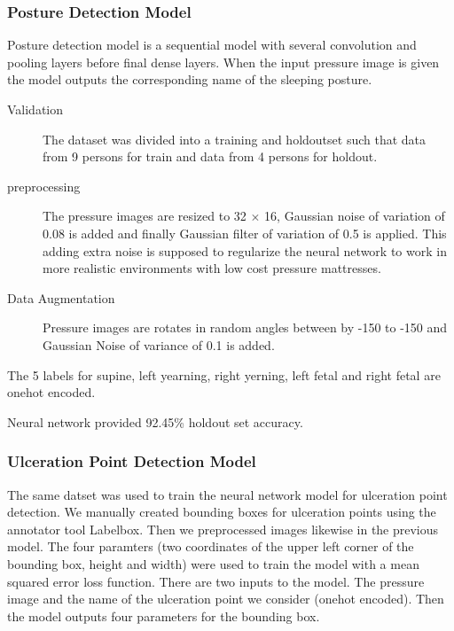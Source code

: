 \subsubsection{Posture Detection Model}

Posture detection model is a sequential model with several convolution and pooling layers before final dense layers. When the input pressure image is given the model outputs the corresponding name of the sleeping posture.


\begin{description}
	\item[Validation] The dataset was divided into a training and holdoutset such that data from 9 persons for train and data from 4 persons for holdout.
	\item[preprocessing] The pressure images are resized to 32 $\times$ 16, Gaussian noise of variation of 0.08 is added and finally Gaussian filter of variation of 0.5 is applied. This adding extra noise is supposed to regularize the neural network to work in more realistic environments with low cost pressure mattresses.
	\item[Data Augmentation]  Pressure images are rotates in random angles between by -150 to -150 and Gaussian Noise of variance of 0.1 is added.	
\end{description}

The 5 labels for supine, left yearning, right yerning, left fetal and right fetal are onehot encoded. 

Neural network provided 92.45\% holdout set accuracy.


\subsubsection{Ulceration Point Detection Model}

The same datset was used to train the neural network model for ulceration point detection. We manually created bounding boxes for ulceration points using the annotator tool Labelbox\textsuperscript{\textregistered}. Then we preprocessed images likewise in the previous model.  The four paramters (two coordinates of the upper left corner of the bounding box, height and width) were used to train the model with a mean squared error loss function. There are two inputs to the model. The pressure image and the name of the ulceration point we consider (onehot encoded). Then the model outputs four parameters for the bounding box. 


